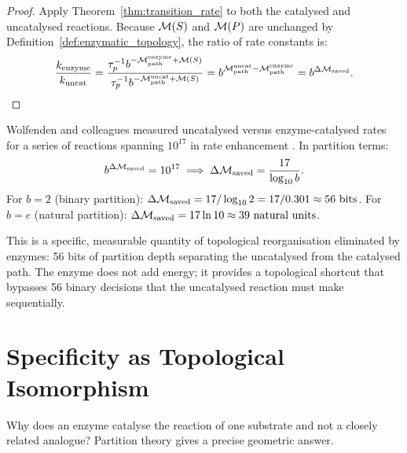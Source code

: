 \begin{proof}
Apply Theorem~\ref{thm:transition_rate} to both the catalysed and uncatalysed
reactions. Because $\mathcal{M}(S)$ and $\mathcal{M}(P)$ are unchanged by
Definition~\ref{def:enzymatic_topology}, the ratio of rate constants is:
\begin{equation}
  \frac{k_{\mathrm{enzyme}}}{k_{\mathrm{uncat}}}
    = \frac{\tau_p^{-1} b^{-\mathcal{M}_{\mathrm{path}}^{\mathrm{enzyme}} + \mathcal{M}(S)}}
           {\tau_p^{-1} b^{-\mathcal{M}_{\mathrm{path}}^{\mathrm{uncat}} + \mathcal{M}(S)}}
    = b^{\mathcal{M}_{\mathrm{path}}^{\mathrm{uncat}} - \mathcal{M}_{\mathrm{path}}^{\mathrm{enzyme}}}
    = b^{\Delta\mathcal{M}_{\mathrm{saved}}}.
\end{equation}
\end{proof}

\begin{example}
\label{ex:wolfenden}
Wolfenden and colleagues measured uncatalysed versus enzyme-catalysed rates
for a series of reactions spanning $10^{17}$ in rate enhancement
\citep{Wolfenden2001}. In partition terms:
\begin{equation}
  b^{\Delta\mathcal{M}_{\mathrm{saved}}} = 10^{17}
  \implies \Delta\mathcal{M}_{\mathrm{saved}} = \frac{17}{\log_{10} b}.
\end{equation}
For $b = 2$ (binary partition):
$\Delta\mathcal{M}_{\mathrm{saved}} = 17 / \log_{10} 2 = 17 / 0.301 \approx 56\ \mathrm{bits}$.
For $b = e$ (natural partition):
$\Delta\mathcal{M}_{\mathrm{saved}} = 17 \ln 10 \approx 39\ \text{natural units}$.

This is a specific, measurable quantity of topological reorganisation eliminated
by enzymes: 56 bits of partition depth separating the uncatalysed from the
catalysed path. The enzyme does not add energy; it provides a topological
shortcut that bypasses 56 binary decisions that the uncatalysed reaction
must make sequentially.
\end{example}

\section{Specificity as Topological Isomorphism}
\label{sec:specificity_isomorphism}

Why does an enzyme catalyse the reaction of one substrate and not a closely
related analogue? Partition theory gives a precise geometric answer.

